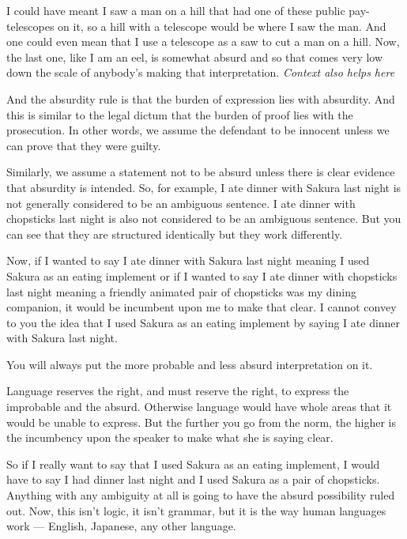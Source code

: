I could have meant I saw a man on a hill that had one of these public pay-telescopes on it, so a hill with a telescope would be where I saw the man. And one could even mean that I use a telescope as a saw to cut a man on a hill. Now, the last one, like I am an eel, is somewhat absurd and so that comes very low down the scale of anybody's making that interpretation. {\em Context also helps here}

\stopsectionlevel

\startsectionlevel[title={The Absurdity Rule},reference={the-absurdity-rule}]

And the absurdity rule is that the burden of expression lies with absurdity. And this is similar to the legal dictum that the burden of proof lies with the prosecution. In other words, we assume the defendant to be innocent unless we can prove that they were guilty.

Similarly, we assume a statement not to be absurd unless there is clear evidence that absurdity is intended. So, for example, I ate dinner with Sakura last night is not generally considered to be an ambiguous sentence. I ate dinner with chopsticks last night is also not considered to be an ambiguous sentence. But you can see that they are structured identically but they work differently.

Now, if I wanted to say I ate dinner with Sakura last night meaning I used Sakura as an eating implement or if I wanted to say I ate dinner with chopsticks last night meaning a friendly animated pair of chopsticks was my dining companion, it would be incumbent upon me to make that clear. I cannot convey to you the idea that I used Sakura as an eating implement by saying I ate dinner with Sakura last night.

You will always put the more probable and less absurd interpretation on it.

\thinrule

Language reserves the right, and must reserve the right, to express the improbable and the absurd. Otherwise language would have whole areas that it would be unable to express. But the further you go from the norm, the higher is the incumbency upon the speaker to make what she is saying clear.

So if I really want to say that I used Sakura as an eating implement, I would have to say I had dinner last night and I used Sakura as a pair of chopsticks. Anything with any ambiguity at all is going to have the absurd possibility ruled out. Now, this isn't logic, it isn't grammar, but it is the way human languages work --- English, Japanese, any other language.

